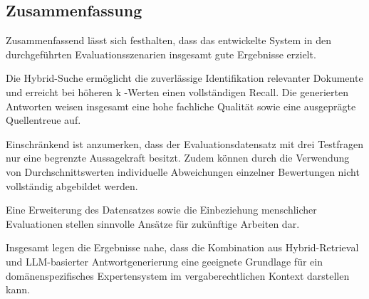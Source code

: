 \subsection{Zusammenfassung}

Zusammenfassend lässt sich festhalten, dass das entwickelte System in den durchgeführten Evaluationsszenarien insgesamt gute Ergebnisse erzielt.

Die Hybrid-Suche ermöglicht die zuverlässige Identifikation relevanter Dokumente und erreicht bei höheren  k -Werten einen vollständigen Recall. Die generierten Antworten weisen insgesamt eine hohe fachliche Qualität sowie eine ausgeprägte Quellentreue auf.

Einschränkend ist anzumerken, dass der Evaluationsdatensatz mit drei Testfragen nur eine begrenzte Aussagekraft besitzt. Zudem können durch die Verwendung von Durchschnittswerten individuelle Abweichungen einzelner Bewertungen nicht vollständig abgebildet werden.

Eine Erweiterung des Datensatzes sowie die Einbeziehung menschlicher Evaluationen stellen sinnvolle Ansätze für zukünftige Arbeiten dar.

Insgesamt legen die Ergebnisse nahe, dass die Kombination aus Hybrid-Retrieval und LLM-basierter Antwortgenerierung eine geeignete Grundlage für ein domänenspezifisches Expertensystem im vergaberechtlichen Kontext darstellen kann.
\clearpage